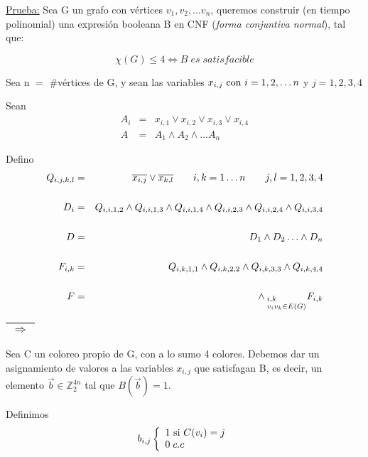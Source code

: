 \documentclass[12pt,a4paper]{report}
\begin{document}
		\underline{Prueba:}
		Sea G un grafo con vértices $v_{1}, v_{2}, \dotsc v_{n}$, queremos construir (en tiempo polinomial) una expresión booleana B en CNF (\textit{forma conjuntiva normal}), tal que:

		\[ \chi(G) \leq 4 \Leftrightarrow B \; es \; satisfacible \]

		Sea n $=$ \#vértices de G, y sean las variables $x_{i, j} \textup{ con } i = 1, 2, \dotsc n$ y $j = 1, 2, 3, 4$

		Sean
		\begin{eqnarray}
			\nonumber A_{i} &=& x_{i, 1} \vee x_{i, 2} \vee x_{i, 3} \vee x_{i, 4}  \\
			\nonumber A &=& A_{1} \wedge A_{2} \wedge \dotsc A_{n}
		\end{eqnarray}

		Defino
		\begin{eqnarray}
			Q_{i, j, k, l} &=& \overline{x_{i, j}} \vee \overline{x_{k, l}}  \qquad i, k = 1 \dotsc n \qquad j, l = 1, 2, 3, 4 \\
			\nonumber \\
			D_{i} &=& Q_{i, i, 1, 2} \wedge Q_{i, i, 1, 3} \wedge Q_{i, i, 1, 4} \wedge Q_{i, i, 2, 3} \wedge Q_{i, i, 2, 4} \wedge Q_{i, i, 3, 4} \\
			\nonumber \\
			D &=& D_{1} \wedge D_{2} \dotsc \wedge D_{n} \\
			\nonumber \\
			F_{i, k} &=& Q_{i, k, 1, 1} \wedge Q_{i, k, 2, 2} \wedge Q_{i, k, 3, 3} \wedge Q_{i, k, 4, 4} \\
			\nonumber \\
			F &=& \wedge_{\begin{subarray}{l} \; i, k \\ \; v_{i} v_{k} \in E(G) \end{subarray}} F_{i, k}
		\end{eqnarray}

		\begin{tabular}{|c|} \hline $\Rightarrow$ \\ \hline \end{tabular}
		\vspace{3mm}

		Sea C un coloreo propio de G, con a lo sumo 4 colores. Debemos dar un asignamiento de valores a las variables $x_{i, j}$ que satisfagan B, es decir, un elemento $\overrightarrow{b} \in \mathbb{Z}^{4n}_{2}$ tal que $B(\overrightarrow{b}) = 1$.

		\vspace{5mm}
		Definimos
		\begin{equation*}
			b_{i, j}
  			\left \lbrace
  			\begin{array}{l}
    		 1 \textup{ si } C(v_{i}) = j \\
     		 0 \; c.c \\
  			\end{array}
  			\right.
		\end{equation*}
\end{document}

